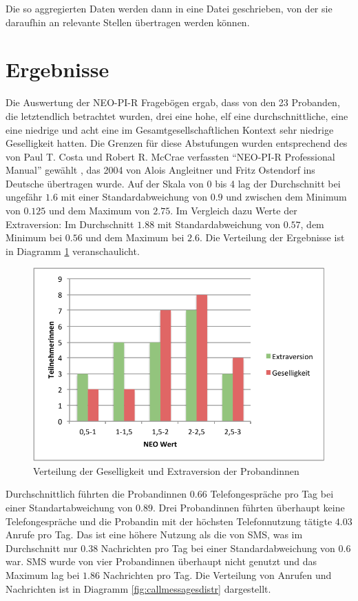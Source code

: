 Die so aggregierten Daten werden dann in eine Datei geschrieben, von der sie daraufhin an relevante Stellen übertragen werden können.

\section{Ergebnisse}

Die Auswertung der NEO-PI-R Fragebögen ergab, dass von den 23 Probanden, die letztendlich betrachtet wurden, drei eine hohe, elf eine durchschnittliche, eine eine niedrige und acht eine im Gesamtgesellschaftlichen Kontext sehr niedrige Geselligkeit hatten.
Die Grenzen für diese Abstufungen wurden entsprechend des von Paul T. Costa und Robert R. McCrae verfassten "`NEO-PI-R Professional Manual"' gewählt \cite{costa1992neo}, das 2004 von Alois Angleitner und Fritz Ostendorf ins Deutsche übertragen wurde\cite{lin1973}.
Auf der Skala von 0 bis 4 lag der Durchschnitt bei ungefähr $1.6$ mit einer Standardabweichung von $0.9$ und zwischen dem Minimum von $0.125$ 
und dem Maximum von $2.75$.
Im Vergleich dazu Werte der Extraversion:
Im Durchschnitt $1.88$ mit Standardabweichung von $0.57$, dem Minimum bei $0.56$ und dem Maximum bei $2.6$.
Die Verteilung der Ergebnisse ist in Diagramm \ref{fig:neoergebnisse} veranschaulicht.

\begin{figure}[h]
    \centering
    \includegraphics{images/NeoErgebnisse.pdf}
    \caption{Verteilung der Geselligkeit und Extraversion der Probandinnen}
    \label{fig:neoergebnisse}
\end{figure}

Durchschnittlich führten die Probandinnen $0.66$ Telefongespräche pro Tag bei einer Standartabweichung von $0.89$.
Drei Probandinnen führten überhaupt keine Telefongespräche und die Probandin mit der höchsten Telefonnutzung tätigte $4.03$ Anrufe pro Tag.
Das ist eine höhere Nutzung als die von SMS, was im Durchschnitt nur $0.38$ Nachrichten pro Tag bei einer Standardabweichung von $0.6$ war.
SMS wurde von vier Probandinnen überhaupt nicht genutzt und das Maximum lag bei $1.86$ Nachrichten pro Tag.
Die Verteilung von Anrufen und Nachrichten ist in Diagramm \ref{fig:callmessagesdistr} dargestellt.

